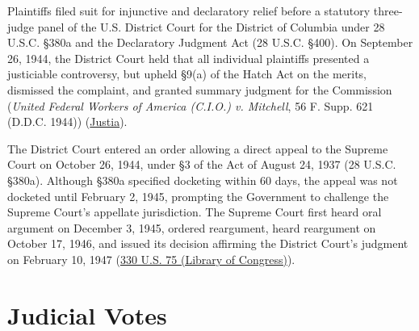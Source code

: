 \documentclass[12pt]{article}
\begin{document}
Plaintiffs filed suit for injunctive and declaratory relief before a statutory three-judge panel of the U.S. District Court for the District of Columbia under 28 U.S.C. \S 380a and the Declaratory Judgment Act (28 U.S.C. \S 400). On September 26, 1944, the District Court held that all individual plaintiffs presented a justiciable controversy, but upheld \S 9(a) of the Hatch Act on the merits, dismissed the complaint, and granted summary judgment for the Commission (\textit{United Federal Workers of America (C.I.O.) v. Mitchell}, 56 F. Supp. 621 (D.D.C. 1944)) (\href{https://supreme.justia.com/cases/federal/us/330/75/}{Justia}).

The District Court entered an order allowing a direct appeal to the Supreme Court on October 26, 1944, under \S 3 of the Act of August 24, 1937 (28 U.S.C. \S 380a). Although \S 380a specified docketing within 60 days, the appeal was not docketed until February 2, 1945, prompting the Government to challenge the Supreme Court's appellate jurisdiction. The Supreme Court first heard oral argument on December 3, 1945, ordered reargument, heard reargument on October 17, 1946, and issued its decision affirming the District Court's judgment on February 10, 1947 (\href{https://tile.loc.gov/storage-services/service/ll/usrep/usrep330/usrep330075/usrep330075.pdf}{330 U.S. 75 (Library of Congress)}).

\section{Judicial Votes}
\end{document}
